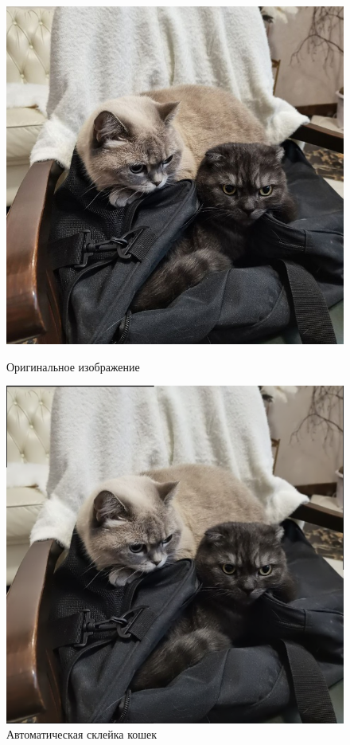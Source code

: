 \documentclass[a4paper, 16pt]{article}
\begin{document}
\begin{figure}[!htb]
    \centering
    \begin{minipage}{0.45\textwidth}
        \centering
        \includegraphics[scale=0.3]{img1.jpg}
        \captionsetup{skip=0pt}
        \caption{Оригинальное изображение}
        \label{Рис:27}
    \end{minipage}
    \begin{minipage}{0.45\textwidth}
        \centering
        \includegraphics[scale=0.3]{auto_join.png}
        \captionsetup{skip=0pt}
        \caption{Автоматическая склейка кошек}
        \label{Рис:28}
    \end{minipage}
\end{figure}
\end{document}
